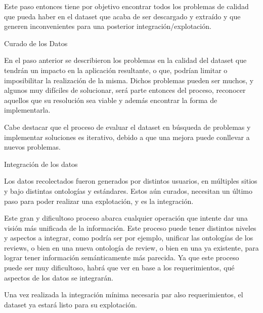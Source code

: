 Este paso entonces tiene por objetivo encontrar todos los problemas de calidad que pueda haber en el dataset que acaba de 
ser descargado y extraído y que generen inconvenientes para una posterior integración/explotación.

%
Curado de los Datos

En el paso anterior se describieron los problemas en la calidad del dataset que tendrán un impacto en la aplicación resultante, 
o que, podrían limitar o imposibilitar la realización de la misma. Dichos problemas pueden ser muchos, y algunos muy difíciles
de solucionar, será parte entonces del proceso, reconocer aquellos que su resolución sea viable y además encontrar la forma de 
implementarla.

Cabe destacar que el proceso de evaluar el dataset en búsqueda de problemas y implementar soluciones es iterativo, debido a que 
una mejora puede conllevar a nuevos problemas.

%

Integración de los datos

Los datos recolectados fueron generados por distintos usuarios, en múltiples sitios y bajo distintas ontologías y estándares.
Estos aún curados, necesitan un último paso para poder realizar una explotación, y es la integración.

Este gran y dificultoso proceso abarca cualquier operación que intente dar una visión más unificada de la información. Este
proceso puede tener distintos niveles y aspectos a integrar, como podría ser por ejemplo, unificar las ontologías de los reviews, o bien
en una nueva ontología de review, o bien en una ya existente, para lograr tener información semánticamente más parecida. Ya 
que este proceso puede ser muy dificultoso, habrá que ver en base a los requerimientos, qué aspectos de los datos se integrarán.

Una vez realizada la integración mínima necesaria par also requerimientos, el dataset ya estará listo para su explotación.